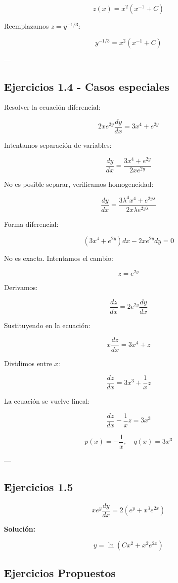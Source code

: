 \[
z(x) = x^2 \left(x^{-1} + C\right)
\]

Reemplazamos \( z = y^{-1/3} \):

\[
y^{-1/3} = x^2 \left(x^{-1} + C\right)
\]

---

\subsection* {Ejercicios 1.4 - Casos especiales}

Resolver la ecuación diferencial:

\[
2x e^{2y} \frac{dy}{dx} = 3x^4 + e^{2y}
\]

Intentamos separación de variables:

\[
\frac{dy}{dx} = \frac{3x^4 + e^{2y}}{2x e^{2y}}
\]

No es posible separar, verificamos homogeneidad:

\[
\frac{dy}{dx} = \frac{3 \lambda^4 x^4 + e^{2y \lambda}}{2x \lambda e^{2y \lambda}}
\]

Forma diferencial:

\[
(3x^4 + e^{2y}) dx - 2x e^{2y} dy = 0
\]

No es exacta. Intentamos el cambio:

\[
z = e^{2y}
\]

Derivamos:

\[
\frac{dz}{dx} = 2e^{2y} \frac{dy}{dx}
\]

Sustituyendo en la ecuación:

\[
x \frac{dz}{dx} = 3x^4 + z
\]

Dividimos entre \( x \):

\[
\frac{dz}{dx} = 3x^3 + \frac{1}{x} z
\]

La ecuación se vuelve lineal:

\[
\frac{dz}{dx} - \frac{1}{x} z = 3x^3
\]

\[
p(x) = -\frac{1}{x}, \quad q(x) = 3x^3
\]

---

\subsection* {Ejercicios 1.5}

\[
x e^y \frac{dy}{dx} = 2(e^y + x^3 e^{2x})
\]

\textbf{Solución:}

\[
y = \ln \left( Cx^2 + x^2 e^{2x} \right)
\]

\subsection{Ejercicios Propuestos}


